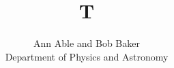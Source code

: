 \documentclass[journal]{IEEEtran}

\title{T}
\author{Ann Able and Bob Baker
\begin{center}
Department of Physics and Astronomy
\end{center}}
\maketitle
Text.


